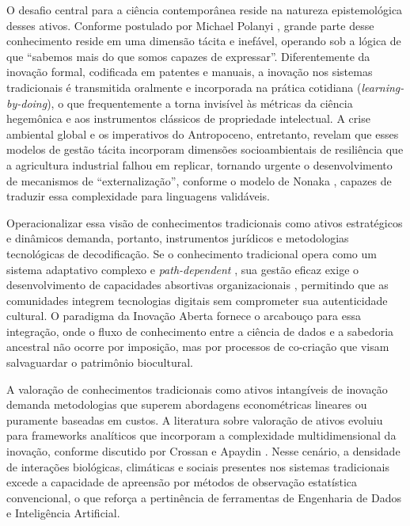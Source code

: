 O desafio central para a ciência contemporânea reside na natureza epistemológica desses ativos. Conforme postulado por Michael Polanyi \cite{Polanyi1966}, grande parte desse conhecimento reside em uma dimensão tácita e inefável, operando sob a lógica de que ``sabemos mais do que somos capazes de expressar''. Diferentemente da inovação formal, codificada em patentes e manuais, a inovação nos sistemas tradicionais é transmitida oralmente e incorporada na prática cotidiana (\textit{learning-by-doing}), o que frequentemente a torna invisível às métricas da ciência hegemônica e aos instrumentos clássicos de propriedade intelectual. A crise ambiental global e os imperativos do Antropoceno, entretanto, revelam que esses modelos de gestão tácita incorporam dimensões socioambientais de resiliência que a agricultura industrial falhou em replicar, tornando urgente o desenvolvimento de mecanismos de ``externalização'', conforme o modelo de Nonaka \cite{Nonaka1995}, capazes de traduzir essa complexidade para linguagens validáveis.

Operacionalizar essa visão de conhecimentos tradicionais como ativos estratégicos e dinâmicos demanda, portanto, instrumentos jurídicos e metodologias tecnológicas de decodificação. Se o conhecimento tradicional opera como um sistema adaptativo complexo e \textit{path-dependent} \cite{Nelson1982}, sua gestão eficaz exige o desenvolvimento de capacidades absortivas organizacionais \cite{CohenLevinthal1990}, permitindo que as comunidades integrem tecnologias digitais sem comprometer sua autenticidade cultural. O paradigma da Inovação Aberta \cite{Chesbrough2003} fornece o arcabouço para essa integração, onde o fluxo de conhecimento entre a ciência de dados e a sabedoria ancestral não ocorre por imposição, mas por processos de co-criação que visam salvaguardar o patrimônio biocultural.

A valoração de conhecimentos tradicionais como ativos intangíveis de inovação demanda metodologias que superem abordagens econométricas lineares ou puramente baseadas em custos. A literatura sobre valoração de ativos evoluiu para frameworks analíticos que incorporam a complexidade multidimensional da inovação, conforme discutido por Crossan e Apaydin \cite{Crossan2010}. Nesse cenário, a densidade de interações biológicas, climáticas e sociais presentes nos sistemas tradicionais excede a capacidade de apreensão por métodos de observação estatística convencional, o que reforça a pertinência de ferramentas de Engenharia de Dados e Inteligência Artificial.

